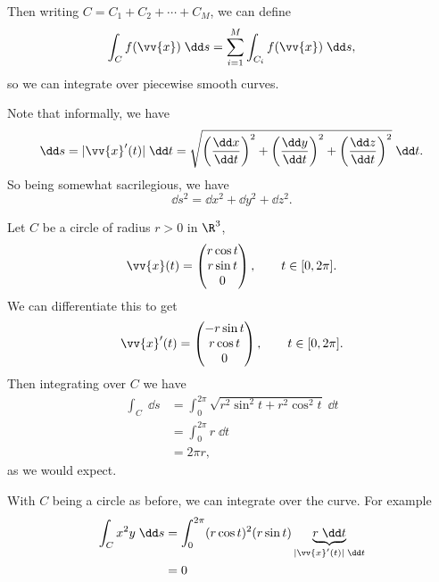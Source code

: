 \begin{center}

\end{center}

Then writing $C = C_1 + C_2 + \cdots + C_M$, we can define
$$
\int_C f(\vv{x}) \; \dd s = \sum_{i = 1}^M \int_{C_i} f(\vv{x}) \; \dd s,
$$
so we can integrate over piecewise smooth curves.

Note that informally, we have 
$$\dd s = |\vv{x}'(t)| \; \dd t = \sqrt{\left(\frac{\dd x}{\dd t}\right)^2 + \left(\frac{\dd y}{\dd t}\right)^2 + \left(\frac{\dd z}{\dd t}\right)^2} \; \dd t.$$
So being somewhat sacrilegious, we have
$$
\dd s^2 = \dd x^2 + \dd y^2 + \dd z^2.
$$

\begin{example}
	Let $C$ be a circle of radius $r > 0$ in $\R^3$,
	$$
	\vv{x}(t) = \begin{pmatrix}
		r \cos t \\
		r \sin t \\
		0
	\end{pmatrix}, \quad \quad t \in [0, 2 \pi].
	$$
	We can differentiate this to get 
	$$
	\vv{x}'(t) = \begin{pmatrix}
		-r \sin t \\
		r \cos t \\
		0
	\end{pmatrix}, \quad \quad t \in [0, 2 \pi].
	$$
	Then integrating over $C$ we have
	\begin{align*}
		\int_C \; \dd s &= \int_0^{2 \pi} \sqrt{r^2 \sin^2 t + r^2 \cos^2 t} \; \dd t\\
		&= \int_0^{2 \pi} r \; \dd t \\
		&= 2 \pi r,
	\end{align*}
	as we would expect.
\end{example}

\begin{example}
	With $C$ being a circle as before, we can integrate over the curve. For example
	\begin{align*}
		\int_C x^2 y \; \dd s &= \int_0^{2 \pi} (r \cos t)^2 (r \sin t) \underbrace{r \; \dd t}_{|\vv{x}'(t)| \; \dd t} \\
		&= 0
	\end{align*}
\end{example}

